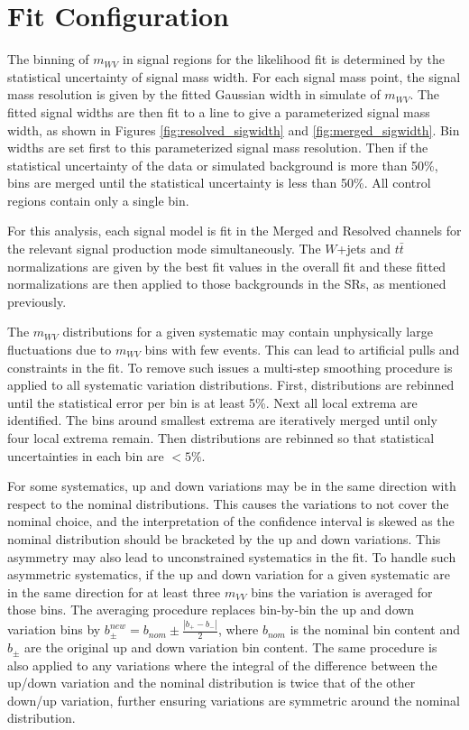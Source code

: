 \section{Fit Configuration}
The binning of $m_{WV}$ in signal regions for the likelihood fit is determined by the statistical uncertainty of signal mass width. For each signal mass point, the signal mass resolution is given by the fitted Gaussian width in simulate of $m_{WV}$. The fitted signal widths are then fit to a line to give a parameterized signal mass width, as shown in Figures \ref{fig:resolved_sigwidth} and \ref{fig:merged_sigwidth}. Bin widths are set first to this parameterized signal mass resolution. Then if the statistical uncertainty of the data or simulated background is more than 50\%, bins are merged until the statistical uncertainty is less than 50\%. All control regions contain only a single bin.

For this analysis, each signal model is fit in the Merged and Resolved channels for the relevant signal production mode simultaneously. The $W$+jets and $t\bar{t}$ normalizations are given by the best fit values in the overall fit and these fitted normalizations are then applied to those backgrounds in the SRs, as mentioned previously.

The $m_{WV}$ distributions for a given systematic may contain unphysically large fluctuations due to $m_{WV}$ bins with few events. This can lead to artificial pulls and constraints in the fit. To remove such issues a multi-step smoothing procedure is applied to all systematic variation distributions. First, distributions are rebinned until the statistical error per bin is at least 5\%. Next all local extrema are identified. The bins around smallest extrema are iteratively merged until only four local extrema remain. Then distributions are rebinned so that statistical uncertainties in each bin are $< 5\%$.

For some systematics, up and down variations may be in the same direction with respect to the nominal distributions. This causes the variations to not cover the nominal choice, and the interpretation of the confidence interval is skewed as the nominal distribution should be bracketed by the up and down variations. This asymmetry may also lead to unconstrained systematics in the fit. To handle such asymmetric systematics, if the up and down variation for a given systematic are in the same direction for at least three $m_{VV}$ bins the variation is averaged for those bins. The averaging procedure replaces bin-by-bin the up and down variation bins by $b_{\pm}^{new}=b_{nom}\pm\frac{|b_{+}-b_{-}|}{2}$, where $b_{nom}$ is the nominal bin content and $b_{\pm}$ are the original up and down variation bin content. The same procedure is also applied to any variations where the integral of the difference between the up/down variation and the nominal distribution is twice that of the other down/up variation, further ensuring variations are symmetric around the nominal distribution.

